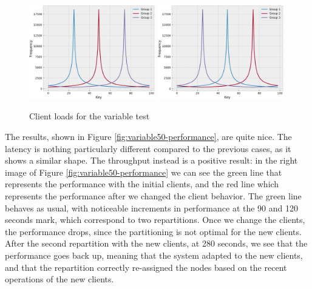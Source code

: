 \begin{figure}[!htb]
  \centering
  \includegraphics[width=0.49\textwidth,height=\textheight,keepaspectratio]{img/clients_loads.png}
  \includegraphics[width=0.49\textwidth,height=\textheight,keepaspectratio]{img/clients_loads_variable.png}
  \caption{ Client loads for the variable test }
  \label{fig:variable-loads}
\end{figure}
The results, shown in Figure \ref{fig:variable50-performance}, are quite nice. The latency is nothing particularly different compared to the previous cases, as it shows a similar shape. The throughput instead is a positive result: in the right image of Figure \ref{fig:variable50-performance} we can see the green line that represents the performance with the initial clients, and the red line which represents the performance after we changed the client behavior. The green line behaves as usual, with noticeable increments in performance at the 90 and 120 seconds mark, which correspond to two repartitions. Once we change the clients, the performance drops, since the partitioning is not optimal for the new clients. After the second repartition with the new clients, at 280 seconds, we see that the performance goes back up, meaning that the system adapted to the new clients, and that the repartition correctly re-assigned the nodes based on the recent operations of the new clients.


